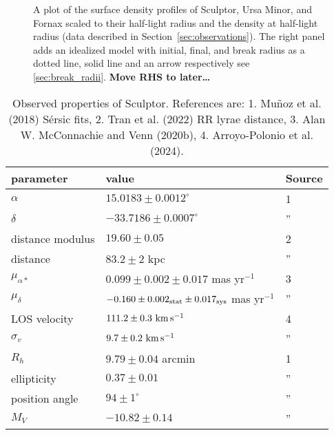 \begin{figure}
\centering
{}
\caption[Sculptor and Ursa Minor match tidal models]{A plot of the
surface density profiles of Sculptor, Ursa Minor, and Fornax scaled to
their half-light radius and the density at half-light radius (data
described in Section~\ref{sec:observations}). The right panel adds an
idealized model with initial, final, and break radius as a dotted line,
solid line and an arrow respectively see \ref{sec:break_radii}.
\textbf{Move RHS to later\ldots{}}}\label{fig:scl_umi_vs_penarrubia}
\end{figure}

\begin{table*}[t]
\centering
\caption[Observed Properties of Sculptor]{Observed properties of Sculptor. References are: 1. Muñoz et al. (2018) Sérsic fits, 2. Tran et al. (2022) RR lyrae distance, 3. Alan W. McConnachie and Venn (2020b), 4. Arroyo-Polonio et al. (2024). }
\label{tbl:scl_obs_props}
\begin{tabular}{lll}
\toprule
parameter & value & Source\\
\midrule
$\alpha$ & $15.0183 \pm 0.0012^\circ$ & 1\\
$\delta$ & $-33.7186 \pm 0.0007^\circ$ & ”\\
distance modulus & $19.60 \pm 0.05$ & 2\\
distance & $83.2 \pm 2$ kpc & ”\\
$\mu_{\alpha*}$ & $0.099 \pm 0.002 \pm 0.017$ mas yr$^{-1}$ & 3\\
$\mu_\delta$ & $-0.160 \pm 0.002_{\rm stat} \pm 0.017_{\rm sys}$ mas yr$^{-1}$ & ”\\
LOS velocity & $111.2 \pm 0.3\ {\rm km\,s^{-1}}$ & 4\\
$\sigma_v$ & $9.7\pm0.2\ {\rm km\,s^{-1}}$ & ”\\
$R_h$ & $9.79 \pm 0.04$ arcmin & 1\\
ellipticity & $0.37 \pm 0.01$ & ”\\
position angle & $94\pm1^\circ$ & ”\\
$M_V$ & $-10.82\pm0.14$ & ”\\
\bottomrule
\end{tabular}
\end{table*}

